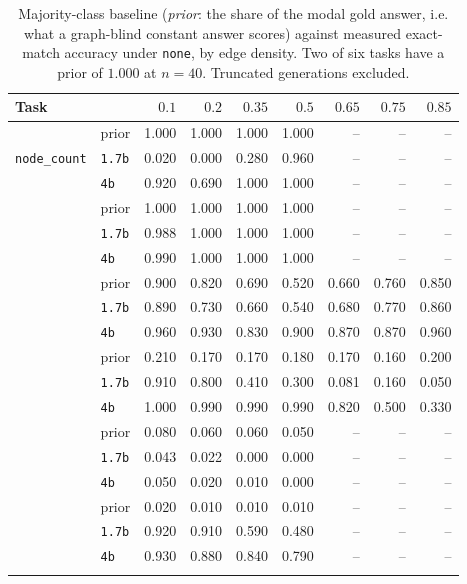 \begin{table}[t]
\centering\small
\setlength{\tabcolsep}{4pt}
\begin{tabular}{llrrrrrrr}
\toprule
Task & & $0.1$ & $0.2$ & $0.35$ & $0.5$ & $0.65$ & $0.75$ & $0.85$ \\
\midrule
\multirow{3}{*}{\texttt{node\_count}} & prior & 1.000 & 1.000 & 1.000 & 1.000 & -- & -- & -- \\
 & \texttt{1.7b} & 0.020 & 0.000 & 0.280 & 0.960 & -- & -- & -- \\
 & \texttt{4b} & 0.920 & 0.690 & 1.000 & 1.000 & -- & -- & -- \\
\addlinespace[2pt]
\multirow{3}{*}{\texttt{cycle\_check}} & prior & 1.000 & 1.000 & 1.000 & 1.000 & -- & -- & -- \\
 & \texttt{1.7b} & 0.988 & 1.000 & 1.000 & 1.000 & -- & -- & -- \\
 & \texttt{4b} & 0.990 & 1.000 & 1.000 & 1.000 & -- & -- & -- \\
\addlinespace[2pt]
\multirow{3}{*}{\texttt{edge\_existence}} & prior & 0.900 & 0.820 & 0.690 & 0.520 & 0.660 & 0.760 & 0.850 \\
 & \texttt{1.7b} & 0.890 & 0.730 & 0.660 & 0.540 & 0.680 & 0.770 & 0.860 \\
 & \texttt{4b} & 0.960 & 0.930 & 0.830 & 0.900 & 0.870 & 0.870 & 0.960 \\
\addlinespace[2pt]
\multirow{3}{*}{\texttt{node\_degree}} & prior & 0.210 & 0.170 & 0.170 & 0.180 & 0.170 & 0.160 & 0.200 \\
 & \texttt{1.7b} & 0.910 & 0.800 & 0.410 & 0.300 & 0.081 & 0.160 & 0.050 \\
 & \texttt{4b} & 1.000 & 0.990 & 0.990 & 0.990 & 0.820 & 0.500 & 0.330 \\
\addlinespace[2pt]
\multirow{3}{*}{\texttt{edge\_count}} & prior & 0.080 & 0.060 & 0.060 & 0.050 & -- & -- & -- \\
 & \texttt{1.7b} & 0.043 & 0.022 & 0.000 & 0.000 & -- & -- & -- \\
 & \texttt{4b} & 0.050 & 0.020 & 0.010 & 0.000 & -- & -- & -- \\
\addlinespace[2pt]
\multirow{3}{*}{\texttt{connected\_nodes}} & prior & 0.020 & 0.010 & 0.010 & 0.010 & -- & -- & -- \\
 & \texttt{1.7b} & 0.920 & 0.910 & 0.590 & 0.480 & -- & -- & -- \\
 & \texttt{4b} & 0.930 & 0.880 & 0.840 & 0.790 & -- & -- & -- \\
\addlinespace[2pt]
\bottomrule
\end{tabular}
\caption{Majority-class baseline (\emph{prior}: the share of the modal gold answer, i.e. what a graph-blind constant answer scores) against measured exact-match accuracy under \texttt{none}, by edge density. Two of six tasks have a prior of $1.000$ at $n{=}40$. Truncated generations excluded.}
\label{tab:priors}
\end{table}
